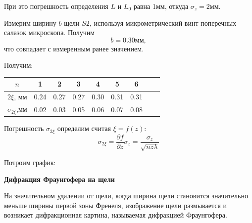 \documentclass[14pt]{article}
\begin{document}
При это погрешность определения $L$ и $L_0$ равна 1мм, откуда $\sigma_z = 2$мм.

Измерим ширину $b$ щели $S2$, используя микрометрический винт поперечных салазок микроскопа. Получим
$$
	b = 0.30 \text{мм},
$$
\noindent что совпадает с измеренным ранее значением. 

Получим:
\begin{center}
\begin{tabular}{|c|c|c|c|c|c|c|c|c|}
\hline
$n$					&	1		&	2		&	3		&	4		&	5		&	6		\\
\hline
$2\xi$, мм			&	0.24	&	0.27	&	0.27	&	0.30	&	0.31	&	0.31	\\
\hline
$\sigma_{2\xi}$,мм	&	0.02	&	0.03	&	0.05	&	0.06	&	0.07	&	0.08	\\
\hline
\end{tabular}
\end{center}

Погрешность $\sigma_{2\xi}$ определим считая $\xi = f(z)$:
$$
	\sigma_{2\xi} = \frac{\partial f}{\partial z}\sigma_z = \frac{\sigma_z}{\sqrt{nz\lambda}}
$$

Потроим график:
\begin{flushleft}
\end{flushleft}

\vspace{1cm}
\textbf{Дифракция Фраунгофера на щели}

На значительном удалении от щели, когда ширина щели становится значительно меньше ширины первой зоны Френеля, изображение щели размывается и возникает дифракционная картина, называемая дифракцией Фраунгофера.
\end{document}
